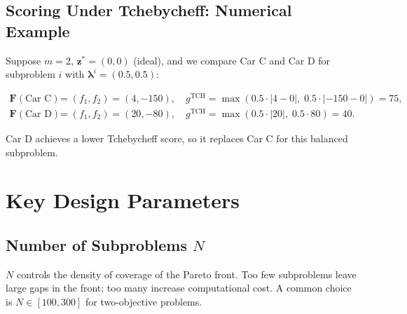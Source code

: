 \documentclass[12pt,a4paper]{article}
\begin{document}
\subsection{Scoring Under Tchebycheff: Numerical Example}

Suppose $m = 2$, $\mathbf{z}^* = (0, 0)$ (ideal), and we compare Car C and Car D for subproblem $i$ with $\boldsymbol{\lambda}^i = (0.5, 0.5)$:

\begin{align}
    \mathbf{F}(\text{Car C}) &= (f_1, f_2) = (4, -150), \quad
    g^{\text{TCH}} = \max(0.5 \cdot |4 - 0|,\; 0.5 \cdot |-150 - 0|) = 75, \\[4pt]
    \mathbf{F}(\text{Car D}) &= (f_1, f_2) = (20, -80), \quad
    g^{\text{TCH}} = \max(0.5 \cdot |20|,\; 0.5 \cdot 80) = 40.
\end{align}

Car D achieves a lower Tchebycheff score, so it replaces Car C for this balanced subproblem.

\section{Key Design Parameters}
\label{sec:design}

\subsection{Number of Subproblems $N$}

$N$ controls the density of coverage of the Pareto front. Too few subproblems leave large gaps in the front; too many increase computational cost. A common choice is $N \in [100, 300]$ for two-objective problems.
\end{document}
